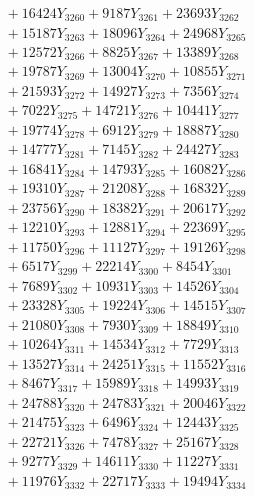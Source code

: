 \documentclass[a4paper,10pt]{article}
\begin{document}
{\begin{align}
&\;  + 16424 Y_{3260} + 9187 Y_{3261} + 23693 Y_{3262} \\[0.3ex]
&\;  + 15187 Y_{3263} + 18096 Y_{3264} + 24968 Y_{3265} \\[0.3ex]
&\;  + 12572 Y_{3266} + 8825 Y_{3267} + 13389 Y_{3268} \\[0.5ex]\allowbreak
&\;  + 19787 Y_{3269} + 13004 Y_{3270} + 10855 Y_{3271} \\[0.3ex]
&\;  + 21593 Y_{3272} + 14927 Y_{3273} + 7356 Y_{3274} \\[0.3ex]
&\;  + 7022 Y_{3275} + 14721 Y_{3276} + 10441 Y_{3277} \\[0.3ex]
&\;  + 19774 Y_{3278} + 6912 Y_{3279} + 18887 Y_{3280} \\[0.3ex]
&\;  + 14777 Y_{3281} + 7145 Y_{3282} + 24427 Y_{3283} \\[0.3ex]
&\;  + 16841 Y_{3284} + 14793 Y_{3285} + 16082 Y_{3286} \\[0.3ex]
&\;  + 19310 Y_{3287} + 21208 Y_{3288} + 16832 Y_{3289} \\[0.3ex]
&\;  + 23756 Y_{3290} + 18382 Y_{3291} + 20617 Y_{3292} \\[0.3ex]
&\;  + 12210 Y_{3293} + 12881 Y_{3294} + 22369 Y_{3295} \\[0.3ex]
&\;  + 11750 Y_{3296} + 11127 Y_{3297} + 19126 Y_{3298} \\[0.5ex]\allowbreak
&\;  + 6517 Y_{3299} + 22214 Y_{3300} + 8454 Y_{3301} \\[0.3ex]
&\;  + 7689 Y_{3302} + 10931 Y_{3303} + 14526 Y_{3304} \\[0.3ex]
&\;  + 23328 Y_{3305} + 19224 Y_{3306} + 14515 Y_{3307} \\[0.3ex]
&\;  + 21080 Y_{3308} + 7930 Y_{3309} + 18849 Y_{3310} \\[0.3ex]
&\;  + 10264 Y_{3311} + 14534 Y_{3312} + 7729 Y_{3313} \\[0.3ex]
&\;  + 13527 Y_{3314} + 24251 Y_{3315} + 11552 Y_{3316} \\[0.3ex]
&\;  + 8467 Y_{3317} + 15989 Y_{3318} + 14993 Y_{3319} \\[0.3ex]
&\;  + 24788 Y_{3320} + 24783 Y_{3321} + 20046 Y_{3322} \\[0.3ex]
&\;  + 21475 Y_{3323} + 6496 Y_{3324} + 12443 Y_{3325} \\[0.3ex]
&\;  + 22721 Y_{3326} + 7478 Y_{3327} + 25167 Y_{3328} \\[0.5ex]\allowbreak
&\;  + 9277 Y_{3329} + 14611 Y_{3330} + 11227 Y_{3331} \\[0.3ex]
&\;  + 11976 Y_{3332} + 22717 Y_{3333} + 19494 Y_{3334} \\[0.3ex]

\end{align}}
\end{document}
